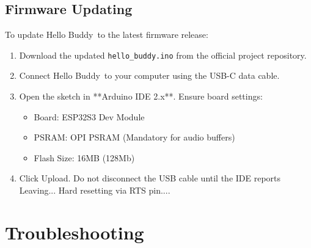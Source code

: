\documentclass[11pt,a4paper,oneside]{report}
\newcommand{\ui}[1]{\textsf{#1}}
\newcommand{\ProductName}{Hello Buddy}
\begin{document}
\section{Firmware Updating}\label{sec:fw}
To update \ProductName\ to the latest firmware release:
\begin{enumerate}[leftmargin=*]
\item Download the updated \texttt{hello\_buddy.ino} from the official project repository.
\item Connect \ProductName\ to your computer using the USB-C data cable.
\item Open the sketch in **Arduino IDE 2.x**. Ensure board settings:
  \begin{itemize}
  \item Board: \ui{ESP32S3 Dev Module}
  \item PSRAM: \ui{OPI PSRAM} (Mandatory for audio buffers)
  \item Flash Size: \ui{16MB (128Mb)}
  \end{itemize}
\item Click \ui{Upload}. Do not disconnect the USB cable until the IDE reports \ui{Leaving... Hard resetting via RTS pin...}.
\end{enumerate}

\chapter{Troubleshooting}\label{ch:trouble}
\end{document}
